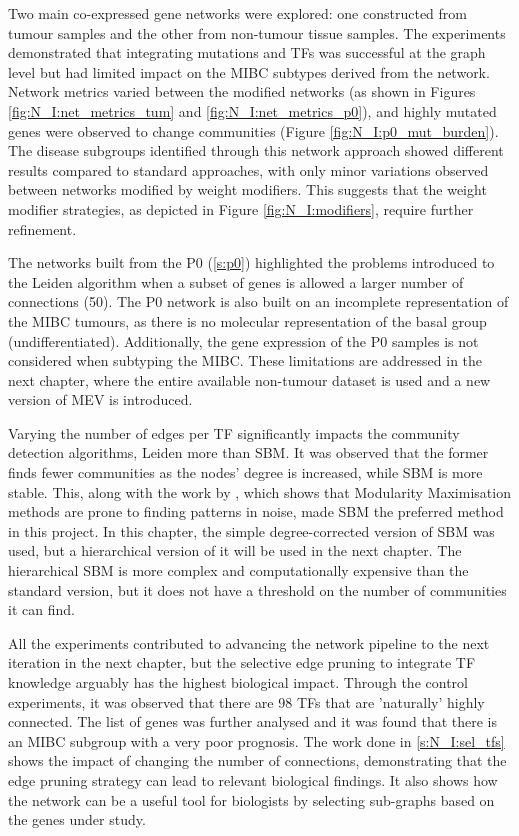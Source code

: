 Two main co-expressed gene networks were explored: one constructed from tumour samples and the other from non-tumour tissue samples. The experiments demonstrated that integrating mutations and TFs was successful at the graph level but had limited impact on the MIBC subtypes derived from the network. Network metrics varied between the modified networks (as shown in Figures \ref{fig:N_I:net_metrics_tum} and \ref{fig:N_I:net_metrics_p0}), and highly mutated genes were observed to change communities (Figure \ref{fig:N_I:p0_mut_burden}). The disease subgroups identified through this network approach showed different results compared to standard approaches, with only minor variations observed between networks modified by weight modifiers. This suggests that the weight modifier strategies, as depicted in Figure \ref{fig:N_I:modifiers}, require further refinement.

The networks built from the P0 (\cref{s:p0}) highlighted the problems introduced to the Leiden algorithm when a subset of genes is allowed a larger number of connections (50). The P0 network is also built on an incomplete representation of the MIBC tumours, as there is no molecular representation of the basal group (undifferentiated). Additionally, the gene expression of the P0 samples is not considered when subtyping the MIBC. These limitations are addressed in the next chapter, where the entire available non-tumour dataset is used and a new version of MEV is introduced.


Varying the number of edges per TF significantly impacts the community detection algorithms, Leiden more than SBM. It was observed that the former finds fewer communities as the nodes' degree is increased, while SBM is more stable. This, along with the work by \citet{Peixoto2021-jx, Peixoto2023-rt}, which shows that Modularity Maximisation methods are prone to finding patterns in noise, made SBM the preferred method in this project. In this chapter, the simple degree-corrected version of SBM was used, but a hierarchical version of it will be used in the next chapter. The hierarchical SBM is more complex and computationally expensive than the standard version, but it does not have a threshold on the number of communities it can find.


All the experiments contributed to advancing the network pipeline to the next iteration in the next chapter, but the selective edge pruning to integrate TF knowledge arguably has the highest biological impact. Through the control experiments, it was observed that there are 98 TFs that are 'naturally' highly connected. The list of genes was further analysed and it was found that there is an MIBC subgroup with a very poor prognosis. The work done in \cref{s:N_I:sel_tfs} shows the impact of changing the number of connections, demonstrating that the edge pruning strategy can lead to relevant biological findings. It also shows how the network can be a useful tool for biologists by selecting sub-graphs based on the genes under study.


